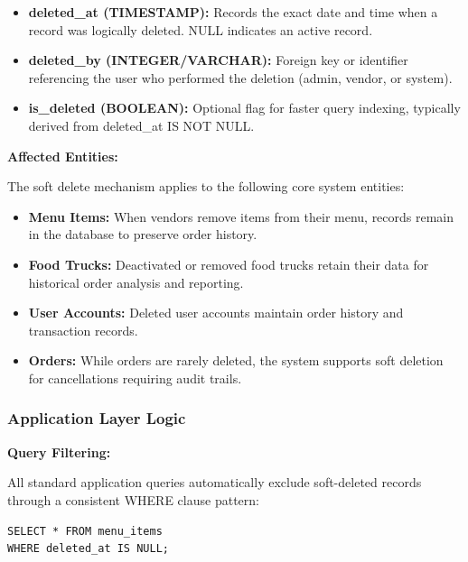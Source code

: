 \documentclass[12pt,a4paper]{article}
\begin{document}
\begin{tcolorbox}[colback=primaryblue!5, colframe=primaryblue, boxrule=1pt, arc=3pt, left=10pt, right=10pt, top=8pt, bottom=8pt]
\begin{itemize}[leftmargin=2em, itemsep=8pt]
    \item \textbf{deleted\_at (TIMESTAMP):} Records the exact date and time when a record was logically deleted. NULL indicates an active record.
    \item \textbf{deleted\_by (INTEGER/VARCHAR):} Foreign key or identifier referencing the user who performed the deletion (admin, vendor, or system).
    \item \textbf{is\_deleted (BOOLEAN):} Optional flag for faster query indexing, typically derived from deleted\_at IS NOT NULL.
\end{itemize}

\vspace{0.5em}

\textbf{Affected Entities:}

The soft delete mechanism applies to the following core system entities:

\begin{itemize}[leftmargin=2em, itemsep=6pt]
    \item \textbf{Menu Items:} When vendors remove items from their menu, records remain in the database to preserve order history.
    \item \textbf{Food Trucks:} Deactivated or removed food trucks retain their data for historical order analysis and reporting.
    \item \textbf{User Accounts:} Deleted user accounts maintain order history and transaction records.
    \item \textbf{Orders:} While orders are rarely deleted, the system supports soft deletion for cancellations requiring audit trails.
\end{itemize}

\subsubsection{Application Layer Logic}

\textbf{Query Filtering:}

All standard application queries automatically exclude soft-deleted records through a consistent WHERE clause pattern:

\begin{verbatim}
SELECT * FROM menu_items 
WHERE deleted_at IS NULL;
\end{verbatim}

\vspace{0.5em}


\end{tcolorbox}
\end{document}
